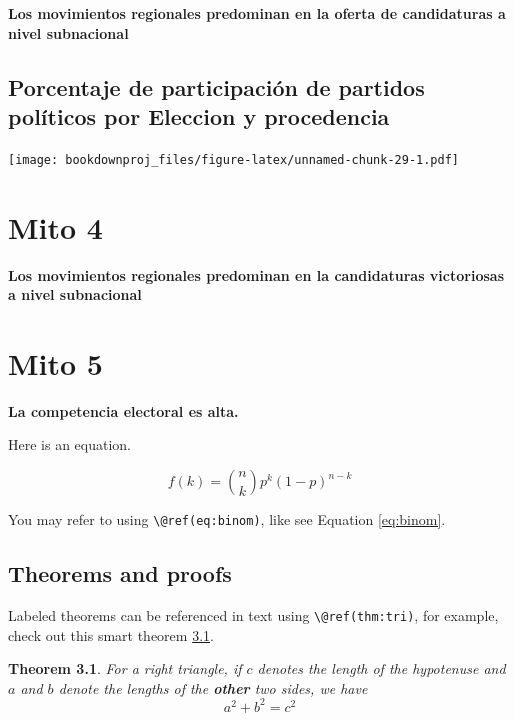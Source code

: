 \documentclass[
]{book}
\newtheorem{theorem}{Theorem}[chapter]
\theoremstyle{definition}
\theoremstyle{definition}
\theoremstyle{definition}
\theoremstyle{definition}
\theoremstyle{remark}
\begin{document}
\textbf{Los movimientos regionales predominan en la oferta de candidaturas a nivel subnacional}

\hypertarget{porcentaje-de-participaciuxf3n-de-partidos-poluxedticos-por-eleccion-y-procedencia}{%
\section{Porcentaje de participación de partidos políticos por Eleccion y procedencia}\label{porcentaje-de-participaciuxf3n-de-partidos-poluxedticos-por-eleccion-y-procedencia}}

\texttt{[image: bookdownproj\_files/figure-latex/unnamed-chunk-29-1.pdf]}

\hypertarget{mito-4}{%
\chapter{Mito 4}\label{mito-4}}

\textbf{Los movimientos regionales predominan en la candidaturas victoriosas a nivel subnacional}

\hypertarget{mito-5}{%
\chapter{Mito 5}\label{mito-5}}

\textbf{La competencia electoral es alta.}

Here is an equation.

\begin{equation} 
  f\left(k\right) = \binom{n}{k} p^k\left(1-p\right)^{n-k}
  \label{eq:binom}
\end{equation}

You may refer to using \texttt{\textbackslash{}@ref(eq:binom)}, like see Equation \eqref{eq:binom}.

\hypertarget{theorems-and-proofs}{%
\section{Theorems and proofs}\label{theorems-and-proofs}}

Labeled theorems can be referenced in text using \texttt{\textbackslash{}@ref(thm:tri)}, for example, check out this smart theorem \ref{thm:tri}.

\begin{theorem}
\protect\hypertarget{thm:tri}{}\label{thm:tri}For a right triangle, if \(c\) denotes the \emph{length} of the hypotenuse
and \(a\) and \(b\) denote the lengths of the \textbf{other} two sides, we have
\[a^2 + b^2 = c^2\]
\end{theorem}
\end{document}
